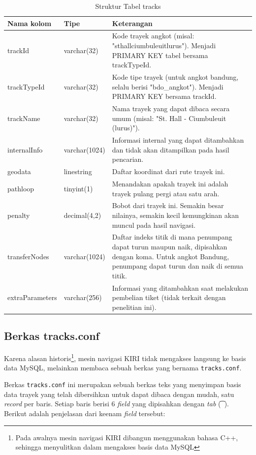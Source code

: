 \begin{table}
	\caption{Struktur Tabel tracks}
	\label{tab:2_struktur_tabel_tracks}
	\begin{tabular}{|p{3cm}|p{2.5cm}|p{9.5cm}|}
		\hline
		Nama kolom & Tipe & Keterangan \\
		\hline
		trackId & varchar(32) & Kode trayek angkot (misal: "sthallciumbuleuitlurus"). Menjadi PRIMARY KEY tabel bersama trackTypeId. \\
		trackTypeId & varchar(32) & Kode tipe trayek (untuk angkot bandung, selalu berisi "bdo\_angkot"). Menjadi PRIMARY KEY bersama trackId. \\
		trackName & varchar(32) & Nama trayek yang dapat dibaca secara umum (misal: "St. Hall - Ciumbuleuit (lurus)"). \\
		internalInfo & varchar(1024) & Informasi internal yang dapat ditambahkan dan tidak akan ditampilkan pada hasil pencarian. \\
		geodata & linestring & Daftar koordinat dari rute trayek ini. \\
		pathloop & tinyint(1) & Menandakan apakah trayek ini adalah trayek pulang pergi atau satu arah. \\
		penalty & decimal(4,2) & Bobot dari trayek ini. Semakin besar nilainya, semakin kecil kemungkinan akan muncul pada hasil navigasi. \\
		transferNodes & varchar(1024) & Daftar indeks titik di mana penumpang dapat turun maupun naik, dipisahkan dengan koma. Untuk angkot Bandung, penumpang dapat turun dan naik di semua titik. \\
		extraParameters & varchar(256) & Informasi yang ditambahkan saat melakukan pembelian tiket (tidak terkait dengan penelitian ini). \\
		\hline
	\end{tabular}
\end{table}

\subsection{Berkas tracks.conf}
Karena alasan historis\footnote{Pada awalnya mesin navigasi KIRI dibangun menggunakan bahasa C++, sehingga menyulitkan dalam mengakses basis data MySQL}, mesin navigasi KIRI tidak mengakses langsung ke basis data MySQL, melainkan membaca sebuah berkas yang bernama \texttt{tracks.conf}.

Berkas \texttt{tracks.conf} ini merupakan sebuah berkas teks yang menyimpan basis data trayek yang telah dibersihkan untuk dapat dibaca dengan mudah, satu \textit{record} per baris. Setiap baris berisi 6 \textit{field} yang dipisahkan dengan \textit{tab} (\texttt{\t}). Berikut adalah penjelasan dari keenam \textit{field} tersebut:


